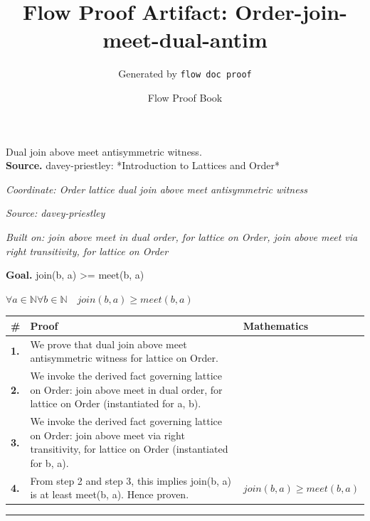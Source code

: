 \documentclass[11pt]{article}
\title{Flow Proof Artifact: Order-join-meet-dual-antim}
\author{Generated by \texttt{flow doc proof}}
\date{Flow Proof Book}
\theoremstyle{definition}
\begin{document}
\maketitle
Dual join above meet antisymmetric witness.\\[0.5em]
\textbf{Source.} davey-priestley: *Introduction to Lattices and Order*\\[0.5em]
\bigskip
{}\par
\smallskip\noindent\textit{Coordinate: Order \cdot lattice \cdot dual join above meet antisymmetric witness}\par
\smallskip\noindent\textit{Source: davey-priestley}\par
\smallskip\noindent\textit{Built on: join above meet in dual order, for lattice on Order, join above meet via right transitivity, for lattice on Order}\par
\medskip
\noindent\textbf{Goal.} join(b, a) >= meet(b, a)\par
\noindent$\displaystyle \forall a \in \mathbb{N} \forall b \in \mathbb{N}\quad join(b, a) \ge meet(b, a)$\par
\medskip
\noindent
\begin{tabular}{@{} >{\raggedright\arraybackslash}p{} >{\raggedright\arraybackslash}p{} >{\raggedleft\arraybackslash}p{} @{}}
\textbf{\#} & \textbf{Proof} & \textbf{Mathematics} \\
\midrule
\textbf{1.} & We prove that dual join above meet antisymmetric witness for lattice on Order. & \\[0.45em]
\textbf{2.} & We invoke the derived fact governing lattice on Order: join above meet in dual order, for lattice on Order (instantiated for a, b). & \\[0.45em]
\textbf{3.} & We invoke the derived fact governing lattice on Order: join above meet via right transitivity, for lattice on Order (instantiated for b, a). & \\[0.45em]
\textbf{4.} & From step 2 and step 3, this implies join(b, a) is at least meet(b, a). Hence proven. & $\displaystyle join(b, a) \ge meet(b, a)$ \\[0.45em]
\bottomrule
\end{tabular}
\label{thm:Order-lattice-dual_join_above_meet_antisymmetric_witness}
\par\medskip\hrule
\end{document}
